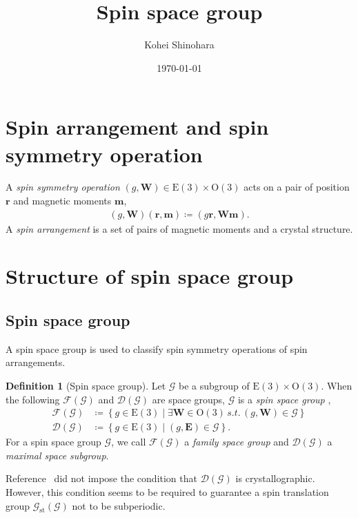 \documentclass[a4paper, 11pt]{article}
\title{Spin space group}
\author{Kohei Shinohara}
\date{\today}
\theoremstyle{definition}
\newcommand{\term}[1]{\textit{#1}}
\newcommand{\relmiddle}[1]{\mathrel{}\middle#1\mathrel{}}
\newcommand{\set}[2]{\left\{ #1 \relmiddle| #2 \right\}}
\newtheorem{definition}[theorem]{Definition}
\begin{document}
\maketitle
\tableofcontents

\section{Spin arrangement and spin symmetry operation}

A \term{spin symmetry operation} $(g, \bm{W}) \in \mathrm{E}(3) \times \mathrm{O}(3)$ acts on a pair of position $\bm{r}$ and magnetic moments $\bm{m}$,
\begin{align}
  (g, \bm{W}) (\bm{r}, \bm{m}) \coloneqq (g \bm{r}, \bm{Wm}).
\end{align}
A \term{spin arrangement} is a set of pairs of magnetic moments and a crystal structure.

\section{Structure of spin space group}

\subsection{Spin space group}

A spin space group \cite{doi:10.1063/1.1708514,doi:10.1098/rspa.1966.0211,LITVIN1974538,Opechowski1986} is used to classify spin symmetry operations of spin arrangements.

\begin{screen}
  \begin{definition}[Spin space group]
    Let $\mathcal{G}$ be a subgroup of $\mathrm{E}(3) \times \mathrm{O}(3)$.
    When the following $\mathcal{F}(\mathcal{G})$ and $\mathcal{D}(\mathcal{G})$ are space groups, $\mathcal{G}$ is a \term{spin space group} \cite{LITVIN1974538},
    \begin{align}
      \mathcal{F}(\mathcal{G})
        &\coloneqq \set{ g \in \mathrm{E}(3) }{ \exists \bm{W} \in \mathrm{O}(3) \,s.t.\, (g, \bm{W}) \in \mathcal{G} } \\
      \mathcal{D}(\mathcal{G})
        &\coloneqq \set{ g \in \mathrm{E}(3) }{ (g, \bm{E}) \in \mathcal{G} }.
    \end{align}
    For a spin space group $\mathcal{G}$, we call $\mathcal{F}(\mathcal{G})$ a \term{family space group} and $\mathcal{D}(\mathcal{G})$ a \term{maximal space subgroup}.
  \end{definition}
\end{screen}
Reference~\cite{LITVIN1974538} did not impose the condition that $\mathcal{D}(\mathcal{G})$ is crystallographic.
However, this condition seems to be required to guarantee a spin translation group $\mathcal{G}_{\mathrm{st}}(\mathcal{G})$ not to be subperiodic.
\end{document}
